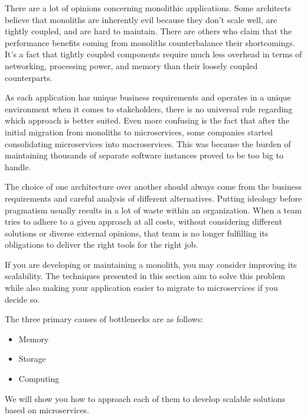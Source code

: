 

There are a lot of opinions concerning monolithic applications. Some architects believe that monoliths are inherently evil because they don't scale well, are tightly coupled, and are hard to maintain. There are others who claim that the performance benefits coming from monoliths counterbalance their shortcomings. It's a fact that tightly coupled components require much less overhead in terms of networking, processing power, and memory than their loosely coupled counterparts.

As each application has unique business requirements and operates in a unique environment when it comes to stakeholders, there is no universal rule regarding which approach is better suited. Even more confusing is the fact that after the initial migration from monoliths to microservices, some companies started consolidating microservices into macroservices. This was because the burden of maintaining thousands of separate software instances proved to be too big to handle.

The choice of one architecture over another should always come from the business requirements and careful analysis of different alternatives. Putting ideology before pragmatism usually results in a lot of waste within an organization. When a team tries to adhere to a given approach at all costs, without considering different solutions or diverse external opinions, that team is no longer fulfilling its obligations to deliver the right tools for the right job.

If you are developing or maintaining a monolith, you may consider improving its scalability. The techniques presented in this section aim to solve this problem while also making your application easier to migrate to microservices if you decide so.

The three primary causes of bottlenecks are as follows:

\begin{itemize}
\item 
Memory

\item 
Storage

\item 
Computing
\end{itemize}

We will show you how to approach each of them to develop scalable solutions based on microservices.


